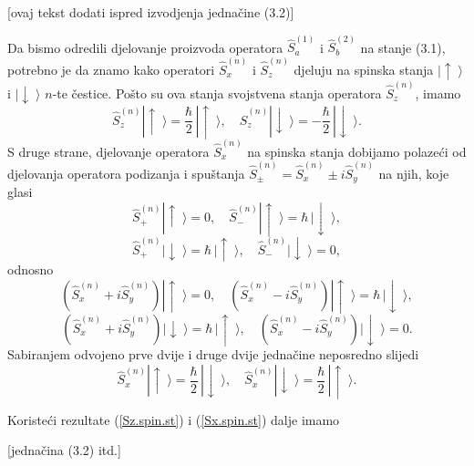 \documentclass[12pt]{article}
\begin{document}
\centerline{[ovaj tekst dodati ispred izvodjenja jedna\v cine
(3.2)]}
\bigskip

Da bismo odredili djelovanje proizvoda operatora $\hat{S}_a^{(1)}$
i $\hat{S}_b^{(2)}$ na stanje (3.1), potrebno je da znamo kako
operatori $\hat{S}_x^{(n)}$ i $\hat{S}_z^{(n)}$ djeluju na spinska
stanja $|\!\uparrow\;\!\rangle$ i $|\!\downarrow\;\!\rangle$
$n$-te \v cestice. Po\v sto su ova stanja svojstvena stanja
operatora $\hat{S}_z^{(n)}$, imamo
\begin{equation}
\hat{S}_z^{(n)} |\!\uparrow\;\!\rangle = \frac{\hbar}{2}\,
|\!\uparrow\;\!\rangle, \quad \hat{S}_z^{(n)}
|\!\downarrow\;\!\rangle = -\frac{\hbar}{2}\,
|\!\downarrow\;\!\rangle. \label{Sz.spin.st}
\end{equation}
S druge strane, djelovanje operatora $\hat{S}_x^{(n)}$ na spinska
stanja dobijamo polaze\'ci od djelovanja operatora podizanja i
spu\v stanja $\hat{S}_\pm^{(n)} = \hat{S}_x^{(n)} \pm i
\hat{S}_y^{(n)}$ na njih, koje glasi
\begin{equation}
\hat{S}_+^{(n)} |\!\uparrow\;\!\rangle = 0, \quad \hat{S}_-^{(n)}
|\!\uparrow\;\!\rangle = \hbar\, |\!\downarrow\;\!\rangle,
\end{equation}
\begin{equation}
\hat{S}_+^{(n)} |\!\downarrow\;\!\rangle = \hbar\,
|\!\uparrow\;\!\rangle, \quad \hat{S}_-^{(n)}
|\!\downarrow\;\!\rangle = 0,
\end{equation}
odnosno
\begin{equation}
(\hat{S}_x^{(n)} + i \hat{S}_y^{(n)}) |\!\uparrow\;\!\rangle = 0,
\quad (\hat{S}_x^{(n)} - i \hat{S}_y^{(n)}) |\!\uparrow\;\!\rangle
= \hbar\, |\!\downarrow\;\!\rangle,
\end{equation}
\begin{equation}
(\hat{S}_x^{(n)} + i \hat{S}_y^{(n)}) |\!\downarrow\;\!\rangle =
\hbar\, |\!\uparrow\;\!\rangle, \quad (\hat{S}_x^{(n)} - i
\hat{S}_y^{(n)}) |\!\downarrow\;\!\rangle = 0.
\end{equation}
Sabiranjem odvojeno prve dvije i druge dvije jedna\v cine
neposredno slijedi
\begin{equation}
\hat{S}_x^{(n)} |\!\uparrow\;\!\rangle = \frac{\hbar}{2}\,
|\!\downarrow\;\!\rangle, \quad \hat{S}_x^{(n)}
|\!\downarrow\;\!\rangle = \frac{\hbar}{2}\,
|\!\uparrow\;\!\rangle. \label{Sx.spin.st}
\end{equation}

Koriste\'ci rezultate (\ref{Sz.spin.st}) i (\ref{Sx.spin.st})
dalje imamo

\bigskip
\centerline{[jedna\v cina (3.2) itd.]}
\end{document}
